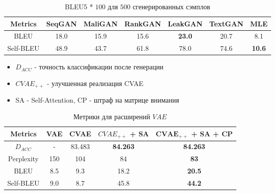 \documentclass[10pt]{beamer}
\begin{document}
\begin{frame}

\begin{table}[H]
\begin{tabular}{c | c c c c c c}
\toprule
Metrics & SeqGAN & MaliGAN & RankGAN & LeakGAN & TextGAN & MLE \\
\midrule
BLEU & 18.0 & 15.9 & 15.6 & \textbf{23.0} & 20.7 & 8.1 \\
Self-BLEU & 48.9 & 43.7 & 61.8 & 78.0 & 74.6 & \textbf{10.6} \\
\bottomrule
\end{tabular}
\caption{BLEU5 * $100$ для $500$ сгенерированных сэмплов}
\end{table}

\vskip-3mm

\begin{itemize}
    \item $D_{ACC}$ - точность классификации после генерации
    \item $CVAE_{++}$ - улучшенная реализация CVAE
    \item SA - Self-Attention, CP - штраф на матрице внимания
\end{itemize}

\begin{table}[H]
\begin{tabular}{c | c c c c}
\toprule
Metrics & VAE & CVAE & $CVAE_{++}$ + SA & \textbf{$\boldsymbol{CVAE_{++}}$ + SA + CP} \\
\midrule
$D_{ACC}$ & - & 83.483 & \textbf{84.263} & \textbf{84.263} \\
Perplexity & 150 & 104 & 84 & \textbf{83} \\
BLEU & 8.5 & 9.3 & 18.2 & \textbf{20.5} \\
Self-BLEU & 9.0 & 8.7 & 45.8 & \textbf{44.2} \\
\bottomrule
\end{tabular}
\caption{Метрики для расширений $VAE$}
\end{table}

\end{frame}
\end{document}
